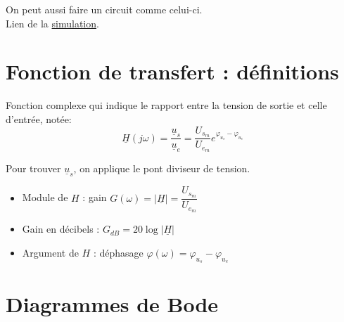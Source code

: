 \documentclass{article}
\begin{document}
{        On peut aussi faire un circuit comme celui-ci.\\
        Lien de la \href{https://www.falstad.com/circuit/circuitjs.html?ctz=CQAgjCAMB0l3BWcBOaAOAbAdgCwCYsBmHMBMHZNQkBSGmuhAUwFowwAoANxB0LxB4EGXv15gRdCLUZQ5MBBwBOogUJEIsI9XLyQOAdxpbxIvgJKTDqwcJCE0OW1aPnT9x+-0APQWjQoSFgI1GCUvOAiAIIAOgDOMgASAF7xAPYAdvEADkwArgAu8VxpAJZK8QCOeUzxADYAhvEFTBlxpZnxACa1cXFpSgWlvUxxRXENBQUAlxl5070AFHN1dUwAlNAcviQBpE4YEuCaEXhOAGKldQVKvQDGaXm58QBGDRk92350xNSEWD8cGZBE4AGrxVo3BZfbBOYhBBBIYgBJxnEDgvoDIZMDh3YzaOyaESEQjAmDwSAQFgIWC7QjIM7IMAkkhQWCUqAcOr4+yknmWeSwCAwMIksBYTA4HBEAFoSABfRGInOEAYNE6RX8o5qpwC-QqHUqw168BwayGnTYNR2TXG7VYCxHfRpOQK3iQcJgOjkoRyULUKR-DhAA}{simulation}.

    }    
    
    \section{Fonction de transfert : définitions}

    Fonction complexe qui indique le rapport entre la tension de sortie et celle d'entrée, notée: 
    $$\underline{H}(j\omega) = \dfrac{\underline{u}_s}{\underline{u}_e} = \dfrac{U_{s_m}}{U_{e_m}} e^{\varphi_{u_s} - \varphi_{u_e}}$$
    
    Pour trouver $\underline{u}_s$, on applique le pont diviseur de tension.

    \begin{itemize}[label=$\ast$]
        \item Module de $H$ : gain $G(\omega) = \left|\underline{H}\right| = \dfrac{U_{s_m}}{U_{e_m}}$
        \item Gain en décibels : $G_{dB} = 20\log{\left|\underline{H}\right|}$
        \item Argument de $H$ : déphasage $\varphi(\omega) = \varphi_{u_s} - \varphi_{u_e}$
    \end{itemize}



    \section{Diagrammes de Bode}
\end{document}
